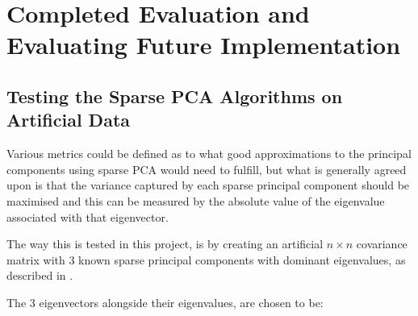 \documentclass[11pt,a4paper]{article}
\begin{document}



 
\clearpage

\section{Completed Evaluation and Evaluating Future Implementation}
\subsection{Testing the Sparse PCA Algorithms on Artificial Data}
Various metrics could be defined as to what good approximations to the principal components using sparse PCA would need to fulfill, but what is generally agreed upon is that the variance captured by each sparse principal component should be maximised and this can be measured by the absolute value of the eigenvalue associated with that eigenvector. 

The way this is tested in this project, is by creating an artificial $n \times n$ covariance matrix with 3 known sparse principal components with dominant eigenvalues, as described in \cite{truncpower}. 

The 3 eigenvectors alongside their eigenvalues, are chosen to be:
\end{document}
